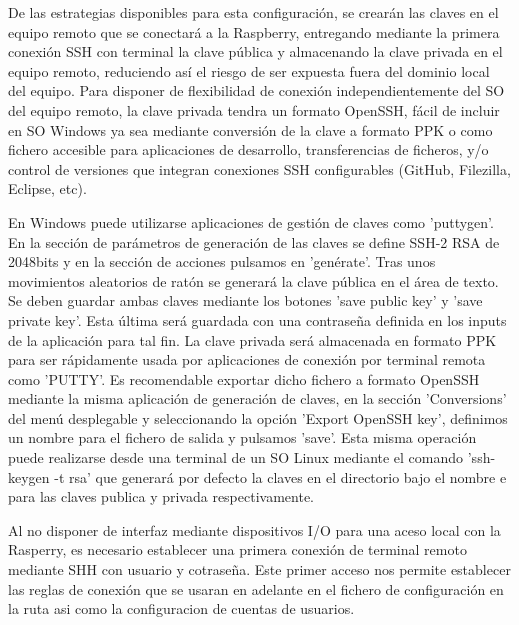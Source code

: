  De las estrategias disponibles para esta configuración, se crearán las claves en el equipo remoto que se conectará a la Raspberry, entregando mediante la primera conexión SSH con terminal la clave pública y almacenando la clave privada en el equipo remoto, reduciendo así el riesgo de ser expuesta fuera del dominio local del equipo. Para disponer de flexibilidad de conexión independientemente del SO del equipo remoto, la clave privada tendra un formato OpenSSH, fácil de incluir en SO Windows ya sea mediante conversión de la clave a formato PPK o como fichero accesible para aplicaciones de desarrollo, transferencias de ficheros, y/o control de versiones que integran conexiones SSH configurables (GitHub, Filezilla, Eclipse, etc).

En Windows puede utilizarse aplicaciones de gestión de claves como 'puttygen'. En la sección de parámetros de generación de las claves se define SSH-2 RSA de 2048bits y en la sección de acciones pulsamos en 'genérate'. Tras unos movimientos aleatorios de ratón se generará la clave pública en el área de texto. Se deben guardar ambas claves mediante los botones 'save public key' y 'save private key'. Esta última será guardada con una contraseña definida en los inputs de la aplicación para tal fin. La clave privada será almacenada en formato PPK para ser rápidamente usada por aplicaciones de conexión por terminal remota como 'PUTTY'. Es recomendable exportar dicho fichero a formato OpenSSH mediante la misma aplicación de generación de claves, en la sección 'Conversions' del menú desplegable y seleccionando la opción 'Export OpenSSH key', definimos un nombre para el fichero de salida y pulsamos 'save'. Esta misma operación puede realizarse desde una terminal de un SO Linux mediante el comando 'ssh-keygen -t rsa' que generará por defecto la claves en el directorio  bajo el nombre  e  para las claves publica y privada respectivamente.

Al no disponer de interfaz mediante dispositivos I/O para una aceso local con la Rasperry, es necesario establecer una primera conexión de terminal remoto mediante SHH con usuario y cotraseña. Este primer acceso nos permite establecer las reglas de conexión que se usaran en adelante en el fichero de configuración en la ruta  asi como la configuracion de cuentas de usuarios.

